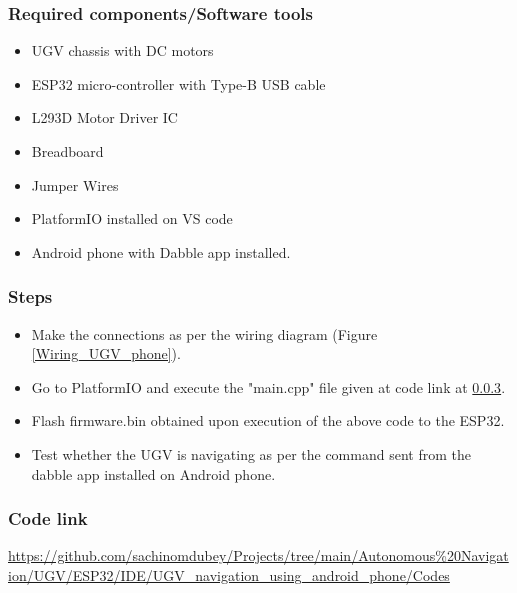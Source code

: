 \subsubsection{Required components/Software tools}
\begin{itemize}
    \item  UGV chassis with DC motors
    \item  ESP32 micro-controller with Type-B USB cable
    \item  L293D Motor Driver IC
    \item  Breadboard
    \item  Jumper Wires
    \item  PlatformIO installed on VS code 
    \item  Android phone with Dabble app installed.
\end{itemize}


\subsubsection{Steps}
\begin{itemize}
    \item Make the connections as per the wiring diagram (Figure \ref{Wiring_UGV_phone}).
    \item Go to PlatformIO and execute the "main.cpp" file given at code link at \ref{Code_link_UGV_phone}.
    \item Flash firmware.bin obtained upon execution of the above code to the ESP32. 
    \item Test whether the UGV is navigating as per the command sent from the dabble app installed on Android phone.
\end{itemize}

\subsubsection{{Code link}}\label{Code_link_UGV_phone}
\begin{tcolorbox}
\url{https://github.com/sachinomdubey/Projects/tree/main/Autonomous\%20Navigation/UGV/ESP32/IDE/UGV_navigation_using_android_phone/Codes}
\end{tcolorbox}

